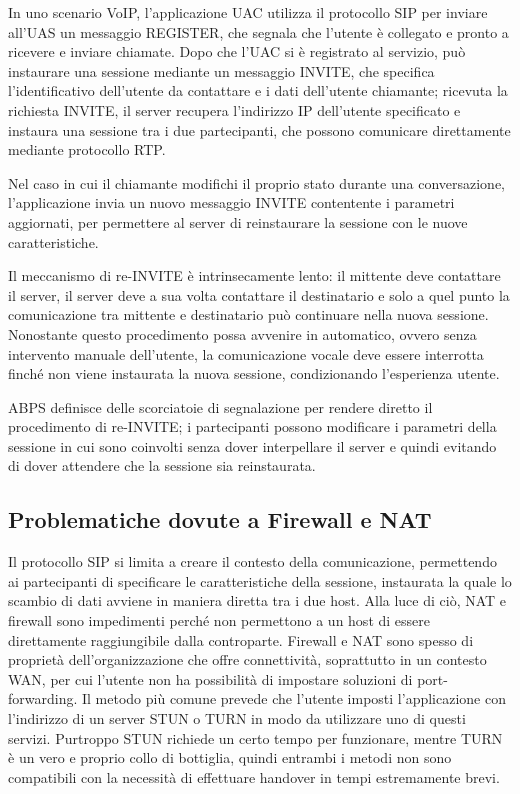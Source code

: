 \documentclass[12pt,a4paper,openright,twoside]{book}
\begin{document}
In uno scenario VoIP, l'applicazione UAC utilizza il protocollo SIP
per inviare all'UAS un messaggio REGISTER, che segnala che l'utente è
collegato e pronto a ricevere e inviare chiamate. Dopo che l'UAC si è
registrato al servizio, può instaurare una sessione mediante un
messaggio INVITE, che specifica l'identificativo dell'utente da
contattare e i dati dell'utente chiamante; ricevuta la richiesta
INVITE, il server recupera l'indirizzo IP dell'utente specificato e
instaura una sessione tra i due partecipanti, che possono comunicare
direttamente mediante protocollo RTP.

Nel caso in cui il chiamante modifichi il proprio stato durante una
conversazione, l'applicazione invia un nuovo messaggio INVITE
contentente i parametri aggiornati, per permettere al server di
reinstaurare la sessione con le nuove caratteristiche.

Il meccanismo di re-INVITE è intrinsecamente lento: il mittente deve
contattare il server, il server deve a sua volta contattare il
destinatario e solo a quel punto la comunicazione tra mittente e
destinatario può continuare nella nuova sessione. Nonostante questo
procedimento possa avvenire in automatico, ovvero senza intervento
manuale dell'utente, la comunicazione vocale deve essere interrotta
finché non viene instaurata la nuova sessione, condizionando
l'esperienza utente.

ABPS definisce delle scorciatoie di segnalazione per rendere diretto il
procedimento di re-INVITE; i partecipanti possono modificare i
parametri della sessione in cui sono coinvolti senza dover
interpellare il server e quindi evitando di dover attendere che la
sessione sia reinstaurata.

\subsection{Problematiche dovute a Firewall e NAT}

Il protocollo SIP si limita a creare il contesto della comunicazione,
permettendo ai partecipanti di specificare le caratteristiche della
sessione, instaurata la quale lo scambio di dati avviene in maniera
diretta tra i due host. Alla luce di ciò, NAT e firewall sono
impedimenti perché non permettono a un host di essere direttamente
raggiungibile dalla controparte. Firewall e NAT sono spesso di
proprietà dell'organizzazione che offre connettività, soprattutto in
un contesto WAN, per cui l'utente non ha possibilità di impostare
soluzioni di port-forwarding. Il metodo più comune prevede che
l'utente imposti l'applicazione con l'indirizzo di un server STUN o
TURN in modo da utilizzare uno di questi servizi. Purtroppo STUN
richiede un certo tempo per funzionare, mentre TURN è un vero e
proprio collo di bottiglia, quindi entrambi i metodi non sono
compatibili con la necessità di effettuare handover in tempi
estremamente brevi.
\end{document}
